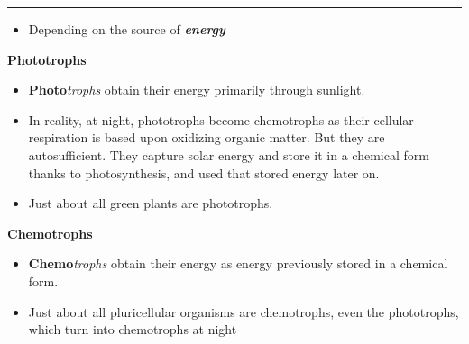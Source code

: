 \documentclass[]{book}
\providecommand{\tightlist}{%
  \setlength{\itemsep}{0pt}\setlength{\parskip}{0pt}}
\theoremstyle{definition}
\theoremstyle{definition}
\theoremstyle{definition}
\theoremstyle{remark}
\begin{document}
\begin{center}\rule{0.5\linewidth}{\linethickness}\end{center}

\begin{itemize}
\tightlist
\item
  Depending on the source of \emph{\textbf{energy}}
\end{itemize}

\textbf{Phototrophs}

\begin{itemize}
\tightlist
\item
  \textbf{Photo}\emph{trophs} obtain their energy primarily through
  sunlight.
\item
  In reality, at night, phototrophs become chemotrophs as their cellular
  respiration is based upon oxidizing organic matter. But they are
  autosufficient. They capture solar energy and store it in a chemical
  form thanks to photosynthesis, and used that stored energy later on.
\item
  Just about all green plants are phototrophs.
\end{itemize}

\textbf{Chemotrophs}

\begin{itemize}
\tightlist
\item
  \textbf{Chemo}\emph{trophs} obtain their energy as energy previously
  stored in a chemical form.
\item
  Just about all pluricellular organisms are chemotrophs, even the
  phototrophs, which turn into chemotrophs at night 
\end{itemize}


\end{document}
